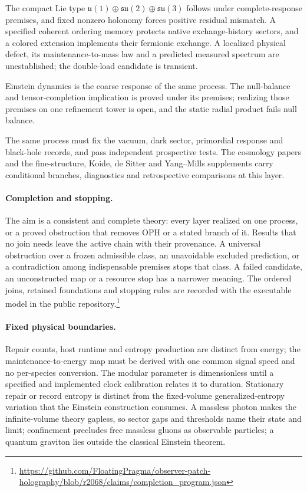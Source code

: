 \begin{description}
  The compact Lie type \(\mathfrak u(1)\oplus\mathfrak{su}(2)\oplus
  \mathfrak{su}(3)\) follows under complete-response premises, and fixed
  nonzero holonomy forces positive residual mismatch. A specified coherent
  ordering memory protects native exchange-history sectors, and a colored
  extension implements their fermionic exchange. A localized physical
  defect, its maintenance-to-mass law and a predicted measured spectrum
  are unestablished; the double-load candidate is transient.
\item[6. Gravity.] Einstein dynamics is the coarse response of the same
  process. The null-balance and tensor-completion implication is proved
  under its premises; realizing those premises on one refinement tower is
  open, and the static radial product fails null balance.
\item[7. Cosmology and tests.] The same process must fix the vacuum, dark
  sector, primordial response and black-hole records, and pass independent
  prospective tests. The cosmology papers and the fine-structure, Koide,
  de Sitter and Yang--Mills supplements carry conditional branches,
  diagnostics and retrospective comparisons at this layer.
\end{description}

\paragraph{Completion and stopping.}
The aim is a consistent and complete theory: every layer realized on one
process, or a proved obstruction that removes OPH or a stated branch of it.
Results that no join needs leave the active chain with their provenance. A
universal obstruction over a frozen admissible class, an unavoidable
excluded prediction, or a contradiction among indispensable premises stops
that class. A failed candidate, an unconstructed map or a resource stop has a
narrower meaning. The ordered joins, retained foundations and stopping
rules are recorded with the executable model in the public
repository.\footnote{\url{https://github.com/FloatingPragma/observer-patch-holography/blob/r2068/claims/completion_program.json}}

\paragraph{Fixed physical boundaries.}
Repair counts, host runtime and entropy production are distinct from
energy; the maintenance-to-energy map must be derived with one common
signal speed and no per-species conversion. The modular parameter is
dimensionless until a specified and implemented clock calibration relates
it to duration. Stationary repair or
record entropy is distinct from the fixed-volume generalized-entropy
variation that the Einstein construction consumes. A massless photon makes
the infinite-volume theory gapless, so sector gaps and thresholds name their
state and limit; confinement precludes free massless gluons as observable
particles; a quantum graviton lies outside the classical Einstein theorem.
